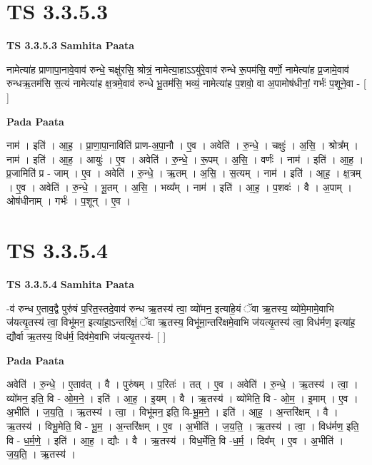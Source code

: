 \documentclass[17pt]{extarticle}
\begin{document}
\section*{ TS 3.3.5.3 }

\textbf{TS 3.3.5.3 } \newline
\textbf{Samhita Paata} \newline

नामेत्या॑ह प्राणापा॒नावे॒वाव॑ रुन्धे॒ चक्षु॑रसि॒ श्रोत्रं॒ नामेत्या॒हाऽऽयु॑रे॒वाव॑ रुन्धे रू॒पम॑सि॒ वर्णो॒ नामेत्या॑ह प्र॒जामे॒वाव॑ रुन्धऋ॒तम॑सि स॒त्यं नामेत्या॑ह क्ष॒त्रमे॒वाव॑ रुन्धे भू॒तम॑सि॒ भव्यं॒ नामेत्या॑ह प॒शवो॒ वा अ॒पामोष॑धीनां॒ गर्भः॑ प॒शूने॒वा - [  ] \newline

\textbf{Pada Paata} \newline

नाम॑ । इति॑ । आ॒ह॒ । प्रा॒णा॒पा॒नाविति॑ प्राण-अ॒पा॒नौ । ए॒व । अवेति॑ । रु॒न्धे॒ । चक्षुः॑ । अ॒सि॒ । श्रोत्र᳚म् । नाम॑ । इति॑ । आ॒ह॒ । आयुः॑ । ए॒व । अवेति॑ । रु॒न्धे॒ । रू॒पम् । अ॒सि॒ । वर्णः॑ । नाम॑ । इति॑ । आ॒ह॒ । प्र॒जामिति॑ प्र - जाम् । ए॒व । अवेति॑ । रु॒न्धे॒ । ऋ॒तम् । अ॒सि॒ । स॒त्यम् । नाम॑ । इति॑ । आ॒ह॒ । क्ष॒त्रम् । ए॒व । अवेति॑ । रु॒न्धे॒ । भू॒तम् । अ॒सि॒ । भव्य᳚म् । नाम॑ । इति॑ । आ॒ह॒ । प॒शवः॑ । वै । अ॒पाम् । ओष॑धीनाम् । गर्भः॑ । प॒शून् । ए॒व ।  \newline




\section*{ TS 3.3.5.4 }

\textbf{TS 3.3.5.4 } \newline
\textbf{Samhita Paata} \newline

-व॑ रुन्ध ए॒ताव॒द्वै पुरु॑षं प॒रित॒स्तदे॒वाव॑ रुन्ध ऋ॒तस्य॑ त्वा॒ व्यो॑मन॒ इत्या॑हे॒यं ॅवा ऋ॒तस्य॒ व्यो॑मे॒मामे॒वाभि ज॑यत्यृ॒तस्य॑ त्वा॒ विभू॑मन॒ इत्या॑हा॒ऽन्तरि॑क्षं॒ ॅवा ऋ॒तस्य॒ विभू॑मा॒न्तरि॑क्षमे॒वाभि ज॑यत्यृ॒तस्य॑ त्वा॒ विध॑र्मण॒ इत्या॑ह॒ द्यौर्वा ऋ॒तस्य॒ विध॑र्म॒ दिव॑मे॒वाभि ज॑यत्यृ॒तस्य॑- [  ] \newline

\textbf{Pada Paata} \newline

अवेति॑ । रु॒न्धे॒ । ए॒ताव॑त् । वै । पुरु॑षम् । प॒रितः॑ । तत् । ए॒व । अवेति॑ । रु॒न्धे॒ । ऋ॒तस्य॑ । त्वा॒ । व्यो॑मन॒ इति॒ वि - ओ॒म॒ने॒ । इति॑ । आ॒ह॒ । इ॒यम् । वै । ऋ॒तस्य॑ । व्यो॑मेति॒ वि - ओ॒म॒ । इ॒माम् । ए॒व । अ॒भीति॑ । ज॒य॒ति॒ । ऋ॒तस्य॑ । त्वा॒ । विभू॑मन॒ इति॒ वि-भू॒म॒ने॒ । इति॑ । आ॒ह॒ । अ॒न्तरि॑क्षम् । वै । ऋ॒तस्य॑ । विभू॒मेति॒ वि - भू॒म॒ । अ॒न्तरि॑क्षम् । ए॒व । अ॒भीति॑ । ज॒य॒ति॒ । ऋ॒तस्य॑ । त्वा॒ । विध॑र्मण॒ इति॒ वि - ध॒र्म॒णे॒ । इति॑ । आ॒ह॒ । द्यौः । वै । ऋ॒तस्य॑ । विध॒र्मेति॒ वि -ध॒र्म॒ । दिव᳚म् । ए॒व । अ॒भीति॑ । ज॒य॒ति॒ । ऋ॒तस्य॑ ।  \newline
\end{document}
